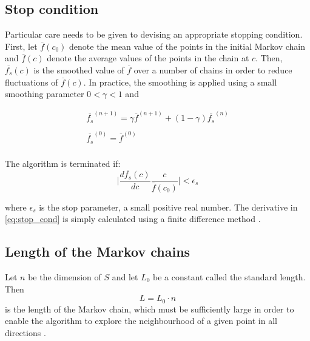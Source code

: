\subsection{Stop condition}

Particular care needs to be given to devising an appropriate stopping condition.
First, let $\overline{f}(c_0)$ denote the mean value of the points in the initial Markov chain and $\overline{f}(c)$ denote
the average values of the points in the chain at $c$. Then, $\overline{f_s}(c)$ is the smoothed value of $\overline{f}$
over a number of chains in order to reduce fluctuations of $\overline{f}(c)$. In practice, the smoothing is applied
using a small smoothing parameter $0 < \gamma < 1$ and

\begin{equation}
    \label{smoothing}
    \begin{array}{c}
    \overline{f_s}^{(n+1)} = \gamma \overline{f}^{(n+1)} + (1-\gamma) \overline{f_s}^{(n)} \\
    \\
    \overline{f_s}^{(0)} = \overline{f}^{(0)} \\
    \end{array}
\end{equation}

The algorithm is terminated if:
\begin{equation}
\label{eq:stop_cond}
    \Bigg|\frac{d \overline{f_s}(c)}{dc} \frac{c}{\overline{f}(c_0)} \Bigg| < \epsilon_s 
\end{equation}

where $\epsilon_s$ is the stop parameter, a small positive real number. The derivative in \cref{eq:stop_cond}
is simply calculated using a finite difference method \cite{dekkers}.
 

\subsection{Length of the Markov chains}
Let $n$ be the dimension of $S$ and let $L_0$ be a constant called the standard length. Then 
\begin{equation}
    L=L_0 \cdot n     
\end{equation}
is the length of the Markov chain, which must be sufficiently large in order to enable the algorithm to explore 
the neighbourhood of a given point in all directions \cite{dekkers}. \vspace{5pt}

